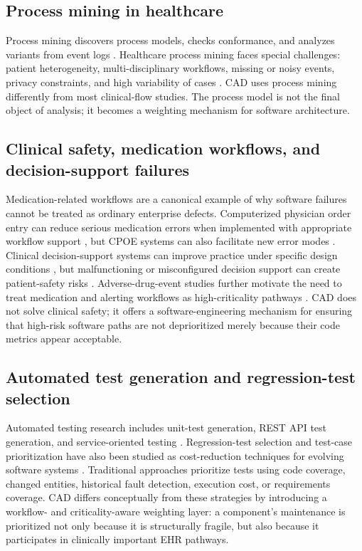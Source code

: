 \documentclass[english,preprint]{elsarticle}
\newcommand{\CAD}{\textsc{CAD}\xspace}
\begin{document}
\subsection{Process mining in healthcare}

Process mining discovers process models, checks conformance, and analyzes variants from event logs \cite{VanderAalst2016Book,VanderAalst2012Manifesto}. Healthcare process mining faces special challenges: patient heterogeneity, multi-disciplinary workflows, missing or noisy events, privacy constraints, and high variability of cases \cite{Rojas2016Healthcare,MunozGama2022Healthcare,DeRoock2022Perspective}. \CAD uses process mining differently from most clinical-flow studies. The process model is not the final object of analysis; it becomes a weighting mechanism for software architecture.

\subsection{Clinical safety, medication workflows, and decision-support failures}

Medication-related workflows are a canonical example of why software failures cannot be treated as ordinary enterprise defects. Computerized physician order entry can reduce serious medication errors when implemented with appropriate workflow support \cite{Bates1998CPOE}, but CPOE systems can also facilitate new error modes \cite{Koppel2005CPOE}. Clinical decision-support systems can improve practice under specific design conditions \cite{Kawamoto2005CDS}, but malfunctioning or misconfigured decision support can create patient-safety risks \cite{Wright2016Malfunctions}. Adverse-drug-event studies further motivate the need to treat medication and alerting workflows as high-criticality pathways \cite{Bates1995ADE}. \CAD does not solve clinical safety; it offers a software-engineering mechanism for ensuring that high-risk software paths are not deprioritized merely because their code metrics appear acceptable.

\subsection{Automated test generation and regression-test selection}

Automated testing research includes unit-test generation, REST API test generation, and service-oriented testing \cite{Fraser2011EvoSuite,Arcuri2018EvoMaster,Bozkurt2013SOATesting,Anand2013TestGeneration}. Regression-test selection and test-case prioritization have also been studied as cost-reduction techniques for evolving software systems \cite{Rothermel1996RTS,Yoo2012Regression,Elbaum2002Prioritization}. Traditional approaches prioritize tests using code coverage, changed entities, historical fault detection, execution cost, or requirements coverage. \CAD differs conceptually from these strategies by introducing a workflow- and criticality-aware weighting layer: a component's maintenance is prioritized not only because it is structurally fragile, but also because it participates in clinically important EHR pathways.
\end{document}
